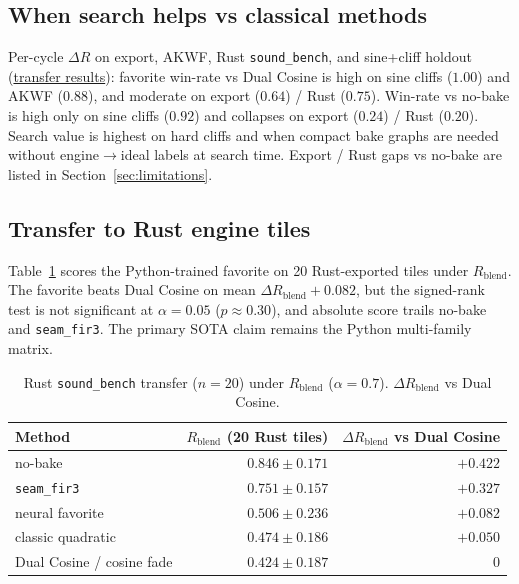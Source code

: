 \subsection{When search helps vs classical methods}
\label{sec:transfer}

Per-cycle $\Delta R$ on export, AKWF, Rust \texttt{sound\_bench}, and sine{+}cliff holdout
(\href{https://github.com/reeldemo/denoise-opt-meta/blob/master/paper/Unsupervised_Wrap-Discontinuity_Repair_in_Wavetable_Synthesis_via_Hybrid_GA-PPO_Meta-Search_v12/figures/transfer_failures.json}{transfer results}):
favorite win-rate vs Dual Cosine is high on sine cliffs ($1.00$) and AKWF ($0.88$), and moderate on export ($0.64$) / Rust ($0.75$).
Win-rate vs no-bake is high only on sine cliffs ($0.92$) and collapses on export ($0.24$) / Rust ($0.20$).
Search value is highest on hard cliffs and when compact bake graphs are needed without engine$\to$ideal labels at search time.
Export / Rust gaps vs no-bake are listed in Section~\ref{sec:limitations}.

\subsection{Transfer to Rust engine tiles}
\label{sec:rust-bench}

Table~\ref{tab:rust-bench} scores the Python-trained favorite on 20 Rust-exported tiles under $R_{\mathrm{blend}}$.
The favorite beats Dual Cosine on mean $\Delta R_{\mathrm{blend}}{+}0.082$, but the signed-rank test is not significant at $\alpha{=}0.05$ ($p{\approx}0.30$),
and absolute score trails no-bake and \texttt{seam\_fir3}.
The primary SOTA claim remains the Python multi-family matrix.

\begin{table}[t]
  \centering
  \caption{Rust \texttt{sound\_bench} transfer ($n{=}20$) under $R_{\mathrm{blend}}$ ($\alpha{=}0.7$).
  $\Delta R_{\mathrm{blend}}$ vs Dual Cosine.}
  \label{tab:rust-bench}
  \setlength{\tabcolsep}{3pt}
  \begin{tabular}{@{}lrr@{}}
    \toprule
    Method & $R_{\mathrm{blend}}$ (20 Rust tiles) & $\Delta R_{\mathrm{blend}}$ vs Dual Cosine \\
    \midrule
    no-bake & $0.846\pm0.171$ & ${+}0.422$ \\
    \texttt{seam\_fir3} & $0.751\pm0.157$ & ${+}0.327$ \\
    neural favorite & $0.506\pm0.236$ & ${+}0.082$ \\
    classic quadratic & $0.474\pm0.186$ & ${+}0.050$ \\
    Dual Cosine / cosine fade & $0.424\pm0.187$ & $0$ \\
    \bottomrule
  \end{tabular}
\end{table}

